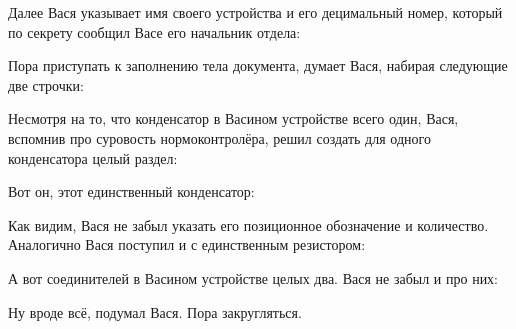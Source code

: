 Далее Вася указывает имя своего устройства и его децимальный номер, который
по секрету сообщил Васе его начальник отдела:


Пора приступать к заполнению тела документа, думает Вася, набирая следующие
две строчки:


Несмотря на то, что конденсатор в Васином устройстве всего один, Вася, вспомнив
про суровость нормоконтролёра,  решил создать для одного конденсатора целый
раздел:


Вот он, этот единственный конденсатор:


Как видим, Вася не забыл указать его позиционное обозначение и
количество. Аналогично Вася поступил и с единственным резистором:


А вот соединителей в Васином устройстве целых два. Вася не забыл и про них:


Ну вроде всё, подумал Вася. Пора закругляться.



